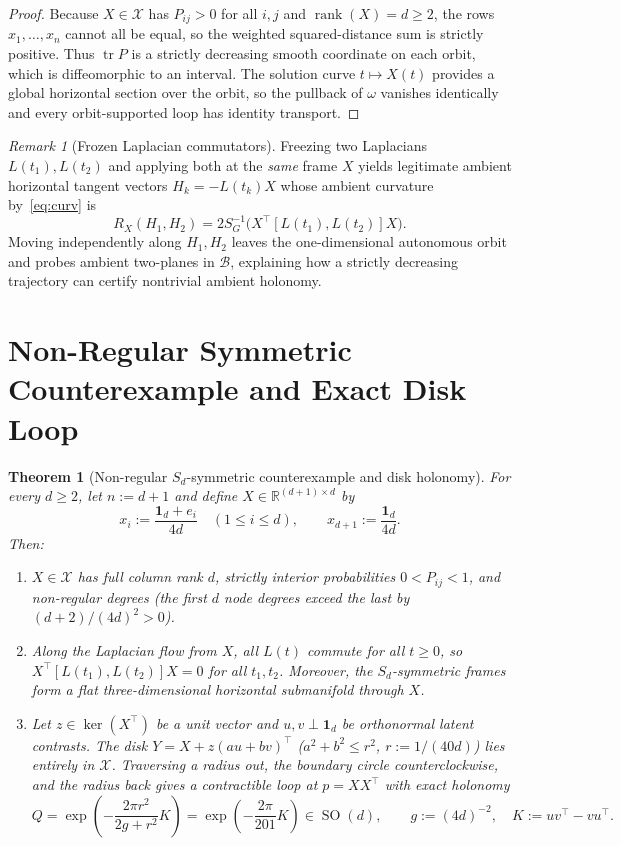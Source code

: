 \documentclass[11pt]{article}
\theoremstyle{plain}
\newtheorem{theorem}{Theorem}
\theoremstyle{definition}
\theoremstyle{remark}
\newtheorem{remark}{Remark}
\DeclareMathOperator{\rank}{rank}
\DeclareMathOperator{\tr}{tr}
\DeclareMathOperator{\SO}{SO}
\begin{document}
\begin{proof}
Because $X \in \mathcal{X}$ has $P_{ij} > 0$ for all $i, j$ and $\rank(X) = d \ge 2$, the rows $x_1, \dots, x_n$ cannot all be equal, so the weighted squared-distance sum is strictly positive.
Thus $\tr P$ is a strictly decreasing smooth coordinate on each orbit, which is diffeomorphic to an interval.
The solution curve $t \mapsto X(t)$ provides a global horizontal section over the orbit, so the pullback of $\omega$ vanishes identically and every orbit-supported loop has identity transport.
\end{proof}

\begin{remark}[Frozen Laplacian commutators]
Freezing two Laplacians $L(t_1), L(t_2)$ and applying both at the \emph{same} frame $X$ yields legitimate ambient horizontal tangent vectors $H_k = -L(t_k)X$ whose ambient curvature by~\eqref{eq:curv} is
\[
R_X(H_1, H_2) = 2 S_G^{-1}\bigl(X^\top [L(t_1), L(t_2)] X\bigr).
\]
Moving independently along $H_1, H_2$ leaves the one-dimensional autonomous orbit and probes ambient two-planes in $\mathcal{B}$, explaining how a strictly decreasing trajectory can certify nontrivial ambient holonomy.
\end{remark}

\section{Non-Regular Symmetric Counterexample and Exact Disk Loop}

\begin{theorem}[Non-regular $S_d$-symmetric counterexample and disk holonomy]\label{thm:symmetric}
For every $d \ge 2$, let $n := d + 1$ and define $X \in \mathbb{R}^{(d+1) \times d}$ by
\[
x_i := \frac{\mathbf{1}_d + e_i}{4d} \quad (1 \le i \le d),
\qquad
x_{d+1} := \frac{\mathbf{1}_d}{4d}.
\]
Then:
\begin{enumerate}[label=\textup{(\arabic*)}]
\item $X \in \mathcal{X}$ has full column rank $d$, strictly interior probabilities $0 < P_{ij} < 1$, and non-regular degrees (the first $d$ node degrees exceed the last by $(d+2)/(4d)^2 > 0$).
\item Along the Laplacian flow from $X$, all $L(t)$ commute for all $t \ge 0$, so $X^\top[L(t_1), L(t_2)]X = 0$ for all $t_1, t_2$. Moreover, the $S_d$-symmetric frames form a flat three-dimensional horizontal submanifold through $X$.
\item Let $z \in \ker(X^\top)$ be a unit vector and $u, v \perp \mathbf{1}_d$ be orthonormal latent contrasts. The disk $Y = X + z(au + bv)^\top$ ($a^2 + b^2 \le r^2$, $r := 1/(40d)$) lies entirely in $\mathcal{X}$. Traversing a radius out, the boundary circle counterclockwise, and the radius back gives a contractible loop at $p = XX^\top$ with exact holonomy
\[
Q = \exp\!\left(-\frac{2\pi r^2}{2g + r^2} K\right) = \exp\!\left(-\frac{2\pi}{201} K\right) \in \SO(d),
\qquad g := (4d)^{-2},\quad K := uv^\top - vu^\top.
\]
\end{enumerate}
\end{theorem}
\end{document}
